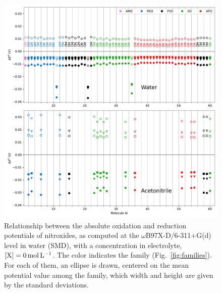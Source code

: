 \documentclass[review,preprint]{elsarticle}
\begin{document}
\begin{figure}[!h]
	\centering
	\includegraphics[width=.9\linewidth]{Figure8}
	\caption{Relationship between the absolute oxidation and reduction potentials of nitroxides, as computed at the $\omega$B97X-D/6-311+G(d) level in water (SMD), with a concentration in electrolyte, $[\ce{X}]=\SI{0}{\mole\per\liter}$. The color indicates the family (Fig.~\ref{fig:families}). For each of them, an ellipse is drawn, centered on the mean potential value among the family, which width and height are given by the standard deviations.}
	\label{fig:family}
\end{figure}
\end{document}
